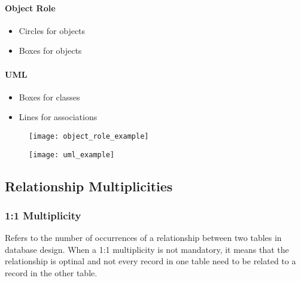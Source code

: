 %
\begin{minipage}[t]{0.48\textwidth}
\paragraph*{Object Role}
\begin{itemize}
    \item Circles for objects
    \item Boxes for objects
\end{itemize}
\end{minipage}
\hfill
\begin{minipage}[t]{0.48\textwidth}
\paragraph*{UML}
\begin{itemize}
    \item Boxes for classes
    \item Lines for associations
\end{itemize}
\end{minipage}

\begin{minipage}{0.48\textwidth}
\begin{figure}[H]
    \centering
    \texttt{[image: object\_role\_example]}
\end{figure}
\end{minipage}
\hfill
\begin{minipage}{0.48\textwidth}
\begin{figure}[H]
    \centering
    \texttt{[image: uml\_example]}
\end{figure}
\end{minipage}

\newpage
\subsection{Relationship Multiplicities}

\subsubsection{1:1 Multiplicity}

Refers to the number of occurrences of a relationship between two tables in database design. When a 1:1 multiplicity is not mandatory, it means that the relationship is optinal and not every record in one table need to be related to a record in the other table.

